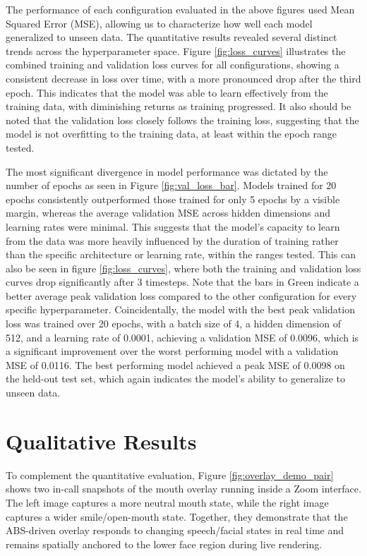 The performance of each configuration evaluated in the above figures used Mean Squared Error (MSE), allowing us to characterize how well each model generalized to unseen data. The quantitative results revealed several distinct trends across the hyperparameter space. Figure \ref{fig:loss_curves} illustrates the combined 
training and validation loss curves for all configurations, showing a consistent decrease in loss over time, with a more pronounced drop after the third epoch. This indicates that the model was able to learn effectively from the training data, with diminishing returns as training progressed.
It also should be noted that the validation loss closely follows the training loss, suggesting that the model is not overfitting to the training data, at least within the epoch range tested.

The most significant divergence in model performance was dictated by the number of epochs as seen in Figure \ref{fig:val_loss_bar}. Models trained for 20 epochs consistently outperformed those trained for only 5 epochs by a visible margin, whereas the average validation MSE across hidden dimensions and learning rates were minimal. 
This suggests that the model's capacity to learn from the data was more heavily influenced by the duration of training rather than the specific architecture or learning rate, within the ranges tested. This can also be seen in figure \ref{fig:loss_curves}, where both the training and validation loss curves drop significantly after 3 timesteps.
Note that the bars in Green indicate a better average peak validation loss compared to the other configuration for every specific hyperparameter. 
Coincidentally, the model with the best peak validation loss was trained over 20 epochs, with a batch size of 4, a hidden dimension of 512, and a learning rate of 0.0001, achieving a validation MSE of 0.0096, which is a significant improvement over the worst performing model with a validation MSE of 0.0116.
The best performing model achieved a peak MSE of 0.0098 on the held-out test set, which again indicates the model's ability to generalize to unseen data.

\section{Qualitative Results}


To complement the quantitative evaluation, Figure \ref{fig:overlay_demo_pair} shows two in-call snapshots of the mouth overlay running inside a Zoom interface. The left image captures a more neutral mouth state, while the right image captures a wider smile/open-mouth state. Together, they demonstrate that the ABS-driven overlay responds to changing speech/facial states in real time and remains spatially anchored to the lower face region during live rendering.

